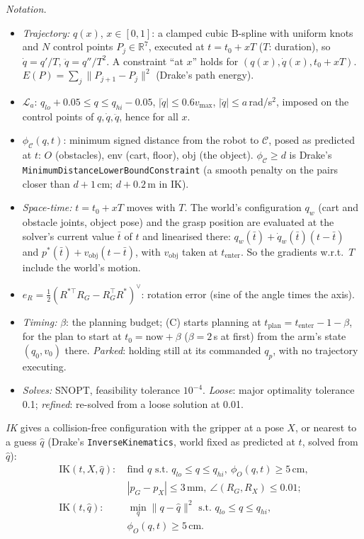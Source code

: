 \documentclass[conference]{IEEEtran}
\begin{document}
\emph{Notation.}
\begin{itemize}
  \item \emph{Trajectory:} $q(x)$, $x\in[0,1]$: a clamped cubic B-spline with uniform knots and $N$ control points
    $P_j\in\mathbb R^7$, executed at $t=t_0+xT$ ($T$: duration), so $\dot q=q'/T$, $\ddot q=q''/T^2$. A constraint
    ``at $x$'' holds for $(q(x),\dot q(x),t_0+xT)$. $E(P)=\sum_j\lVert P_{j+1}-P_j\rVert^2$ (Drake's path
    energy).
  \item $\mathcal L_a$: $q_{lo}+0.05\le q\le q_{hi}-0.05$, $|\dot q|\le0.6v_{\max}$, $|\ddot q|\le a$\,rad/s$^2$,
    imposed on the control points of $q,\dot q,\ddot q$, hence for all $x$.
  \item $\phi_{\mathcal C}(q,t)$: minimum signed distance from the robot to $\mathcal C$, posed as predicted at $t$:
    $O$ (obstacles), env (cart, floor), obj (the object). $\phi_{\mathcal C}\ge d$ is Drake's
    \texttt{MinimumDistanceLowerBoundConstraint} (a smooth penalty on the pairs closer than $d+1$\,cm; $d+0.2$\,m in
    IK).
  \item \emph{Space-time:} $t=t_0+xT$ moves with $T$. The world's configuration $q_w$ (cart and obstacle joints,
    object pose) and the grasp position are evaluated at the solver's current value $\bar t$ of $t$ and linearised
    there: $q_w(\bar t)+\dot q_w(\bar t)(t-\bar t)$ and $p^*(\bar t)+v_{\text{obj}}(t-\bar t)$, with $v_{\text{obj}}$
    taken at $t_{\text{enter}}$. So the gradients w.r.t.\ $T$ include the world's motion.
  \item $e_R=\tfrac12(R^{*\top}R_G-R_G^\top R^*)^\vee$: rotation error (sine of the angle times the axis).
  \item \emph{Timing:} $\beta$: the planning budget; (C) starts planning at $t_{\text{plan}}=t_{\text{enter}}-1-\beta$,
    for the plan to start at $t_0=\text{now}+\beta$ ($\beta=2$\,s at first) from the arm's state $(q_0,v_0)$ there. \emph{Parked}: holding still at its
    commanded $q_p$, with no trajectory executing.
  \item \emph{Solves:} SNOPT, feasibility tolerance $10^{-4}$. \emph{Loose}: major optimality tolerance 0.1;
    \emph{refined}: re-solved from a loose solution at 0.01.
\end{itemize}

\emph{IK} gives a collision-free configuration with the gripper at a pose $X$, or nearest to a guess $\hat q$
(Drake's \texttt{InverseKinematics}, world fixed as predicted at $t$, solved from $\hat q$):
\begin{equation}
\begin{aligned}
\mathrm{IK}(t,X,\hat q):\ & \text{find } q \text{ s.t. } q_{lo}\le q\le q_{hi},\ \phi_O(q,t)\ge5\,\text{cm},\\
& |p_G-p_X|\le3\,\text{mm},\ \angle(R_G,R_X)\le0.01;\\
\mathrm{IK}(t,\hat q):\ & \min_q\lVert q-\hat q\rVert^2 \text{ s.t. } q_{lo}\le q\le q_{hi},\\
& \phi_O(q,t)\ge5\,\text{cm}.
\end{aligned}
\label{eq:ikC}
\end{equation}
\end{document}
